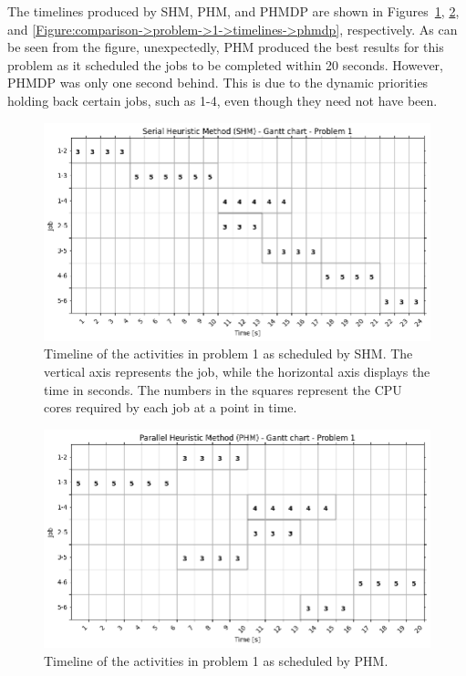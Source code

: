 The timelines produced by SHM, PHM, and PHMDP are shown in Figures~\ref{Figure:comparison->problem->1->timelines->shm}, \ref{Figure:comparison->problem->1->timelines->phm}, and \ref{Figure:comparison->problem->1->timelines->phmdp}, respectively.
As can be seen from the figure, unexpectedly, PHM produced the best results for this problem as it scheduled the jobs to be completed within 20 seconds.
However, PHMDP was only one second behind.
This is due to the dynamic priorities holding back certain jobs, such as 1-4, even though they need not have been.

\begin{figure}[ht!]
	\centering
	\includegraphics[width=0.7\linewidth]{images/comparison/shm_problem_1.png}
	\caption{Timeline of the activities in problem 1 as scheduled by SHM.
		The vertical axis represents the job, while the horizontal axis displays the time in seconds.
		The numbers in the squares represent the CPU cores required by each job at a point in time.
	}
	\label{Figure:comparison->problem->1->timelines->shm}
\end{figure}

\begin{figure}[ht!]
	\centering
	\includegraphics[width=0.7\linewidth]{images/comparison/phm_problem_1.png}
	\caption{Timeline of the activities in problem 1 as scheduled by PHM.}
	\label{Figure:comparison->problem->1->timelines->phm}
\end{figure}


